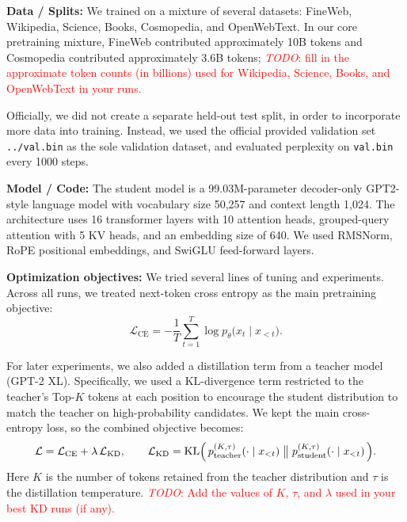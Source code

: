 \documentclass{article}
\renewcommand{\todo}[1]{\textcolor{red}{\emph{TODO}: #1}}
\begin{document}
\noindent\textbf{Data / Splits:} We trained on a mixture of several datasets: FineWeb, Wikipedia, Science, Books, Cosmopedia, and OpenWebText. In our core pretraining mixture, FineWeb contributed approximately 10B tokens and Cosmopedia contributed approximately 3.6B tokens; \todo{fill in the approximate token counts (in billions) used for Wikipedia, Science, Books, and OpenWebText in your runs.}

Officially, we did not create a separate held-out test split, in order to incorporate more data into training. Instead, we used the official provided validation set \texttt{../val.bin} as the sole validation dataset, and evaluated perplexity on \texttt{val.bin} every 1000 steps.

\noindent\textbf{Model / Code:} The student model is a 99.03M-parameter decoder-only GPT2-style language model with vocabulary size 50,257 and context length 1,024. The architecture uses 16 transformer layers with 10 attention heads, grouped-query attention with 5 KV heads, and an embedding size of 640. We used RMSNorm, RoPE positional embeddings, and SwiGLU feed-forward layers.

\noindent\textbf{Optimization objectives:} We tried several lines of tuning and experiments. Across all runs, we treated next-token cross entropy as the main pretraining objective:
\begin{equation}
\mathcal{L}_{\mathrm{CE}} = -\frac{1}{T}\sum_{t=1}^{T} \log p_{\theta}\bigl(x_t \mid x_{<t}\bigr).
\end{equation}

For later experiments, we also added a distillation term from a teacher model (GPT-2 XL). Specifically, we used a KL-divergence term restricted to the teacher's Top-$K$ tokens at each position to encourage the student distribution to match the teacher on high-probability candidates. We kept the main cross-entropy loss, so the combined objective becomes:
\begin{equation}
\mathcal{L} = \mathcal{L}_{\mathrm{CE}} + \lambda\, \mathcal{L}_{\mathrm{KD}},
\qquad
\mathcal{L}_{\mathrm{KD}} = \mathrm{KL}\Bigl(\,p_{\text{teacher}}^{(K,\tau)}(\cdot\mid x_{<t})\;\big\|\;p_{\text{student}}^{(K,\tau)}(\cdot\mid x_{<t})\,\Bigr).
\end{equation}
Here $K$ is the number of tokens retained from the teacher distribution and $\tau$ is the distillation temperature. \todo{Add the values of $K$, $\tau$, and $\lambda$ used in your best KD runs (if any).}
\end{document}
